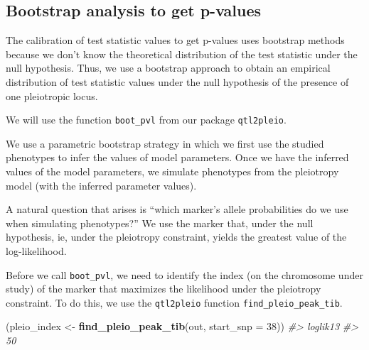 \documentclass{book}
\newenvironment{Shaded}{\begin{snugshade}}{\end{snugshade}}
\newcommand{\CommentTok}[1]{\textcolor[rgb]{0.56,0.35,0.01}{\textit{#1}}}
\newcommand{\DataTypeTok}[1]{\textcolor[rgb]{0.13,0.29,0.53}{#1}}
\newcommand{\DecValTok}[1]{\textcolor[rgb]{0.00,0.00,0.81}{#1}}
\newcommand{\KeywordTok}[1]{\textcolor[rgb]{0.13,0.29,0.53}{\textbf{#1}}}
\newcommand{\NormalTok}[1]{#1}
\newcommand{\StringTok}[1]{\textcolor[rgb]{0.31,0.60,0.02}{#1}}
\begin{document}
\hypertarget{bootstrap-analysis-to-get-p-values}{%
\subsection{Bootstrap analysis to get
p-values}\label{bootstrap-analysis-to-get-p-values}}

The calibration of test statistic values to get p-values uses bootstrap
methods because we don't know the theoretical distribution of the test
statistic under the null hypothesis. Thus, we use a bootstrap approach
to obtain an empirical distribution of test statistic values under the
null hypothesis of the presence of one pleiotropic locus.

We will use the function \texttt{boot\_pvl} from our package
\texttt{qtl2pleio}.

We use a parametric bootstrap strategy in which we first use the studied
phenotypes to infer the values of model parameters. Once we have the
inferred values of the model parameters, we simulate phenotypes from the
pleiotropy model (with the inferred parameter values).

A natural question that arises is ``which marker's allele probabilities
do we use when simulating phenotypes?'' We use the marker that, under
the null hypothesis, ie, under the pleiotropy constraint, yields the
greatest value of the log-likelihood.

Before we call \texttt{boot\_pvl}, we need to identify the index (on the
chromosome under study) of the marker that maximizes the likelihood
under the pleiotropy constraint. To do this, we use the
\texttt{qtl2pleio} function \texttt{find\_pleio\_peak\_tib}.

\begin{Shaded}
\begin{Highlighting}[]
\NormalTok{(pleio_index <-}\StringTok{ }\KeywordTok{find_pleio_peak_tib}\NormalTok{(out, }\DataTypeTok{start_snp =} \DecValTok{38}\NormalTok{))}
\CommentTok{#> loglik13 }
\CommentTok{#>       50}
\end{Highlighting}
\end{Shaded}
\end{document}
